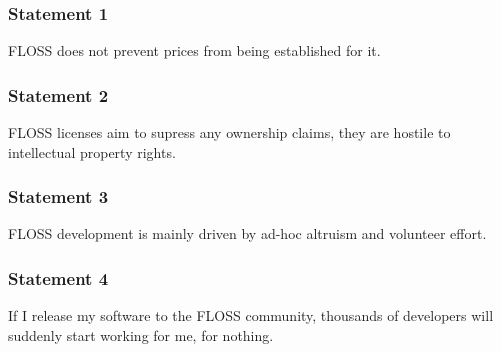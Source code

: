 \documentclass{beamer}
\begin{document}

\begin{frame}
 \frametitle{Statement 1}
 \begin{center}
  \begin{LARGE} FLOSS does not prevent prices from being established for it.  \end{LARGE}
 \end{center}

\end{frame}


\begin{frame}
 \frametitle{Statement 2}
 \begin{center}
  \begin{LARGE} FLOSS licenses aim to supress any ownership claims, they are hostile to
intellectual property rights.  \end{LARGE}
 \end{center}

\end{frame}


\begin{frame}
 \frametitle{Statement 3}
 \begin{center}
  \begin{LARGE} FLOSS development is mainly driven by ad-hoc altruism and volunteer effort. \end{LARGE}
 \end{center}

\end{frame}


\begin{frame}
 \frametitle{Statement 4}
 \begin{center}
  \begin{LARGE} If I release my software to the FLOSS community, thousands of developers 
will suddenly start working for me, for nothing. \end{LARGE}
 \end{center}

\end{frame}

\end{document}
